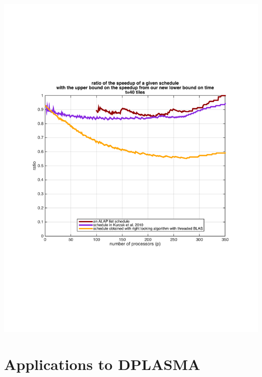 \begin{frame}

\includegraphics[width=.80\textwidth]{matlab_files/borneTempsExecByProc_CLEANED_fig3.pdf}\\

\end{frame}

\section{Applications to DPLASMA}

